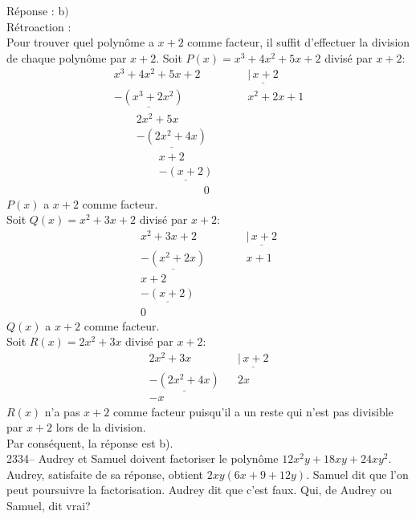 \documentclass[letterpaper, 12pt]{article}
\begin{document}
R\'eponse : b$)$\\

R\'etroaction :\\
Pour trouver quel polyn\^ome a $x+2$ comme facteur, il suffit d'effectuer la division de chaque polyn\^ome par $x+2$. Soit $P(x)=x^{3}+4x^{2}+5x+2$ divis\'e par $x+2$:
\begin{eqnarray*}
x^{3}+4x^{2}+5x+2 & &\underline{|\, x+2}\\
\underline{-(x^{3}+ 2x^{2})} \qquad \qquad & & x^{2}+2x+1\\
\qquad 2x^{2}+5x \qquad\,\,\, & &\\
\qquad \underline{-(2x^{2}+4x)}\qquad & &\\
\qquad \qquad x+2 \,\, & &\\
\qquad \qquad \underline{-(x+2)} \, & &\\
\qquad \qquad \qquad \qquad 0 \, & &
\end{eqnarray*}
$P(x)$ a $x+2$ comme facteur.\\

Soit $Q(x)=x^{2}+3x+2$ divis\'e par $x+2$:
\begin{eqnarray*}
x^{2}+3x+2 & &\underline{|\, x+2}\\
\underline{-(x^{2}+ 2x)} \qquad & & x+1\\
x+2 & &\\
\underline{-(x+2)} & &\\
0 \, & &
\end{eqnarray*}
$Q(x)$ a $x+2$ comme facteur.\\

Soit $R(x)=2x^{2}+3x$ divis\'e par $x+2$:
\begin{eqnarray*}
2x^{2}+3x & &\underline{|\, x+2}\\
\underline{-(2x^{2}+ 4x)}& & 2x\\
-x & &
\end{eqnarray*}
$R(x)$ n'a pas $x+2$ comme facteur puisqu'il a un reste qui n'est pas divisible par $x+2$ lors de la division.\\

Par cons\'equent, la r\'eponse est b).\\

2334-- Audrey et Samuel doivent factoriser le polyn\^ome $12x^{2}y+18xy+24xy^{2}$. Audrey, satisfaite de sa r\'eponse, obtient $2xy(6x+9+12y)$. Samuel dit que l'on peut poursuivre la factorisation. Audrey dit que c'est faux. Qui, de Audrey ou Samuel, dit vrai? \\
\end{document}
